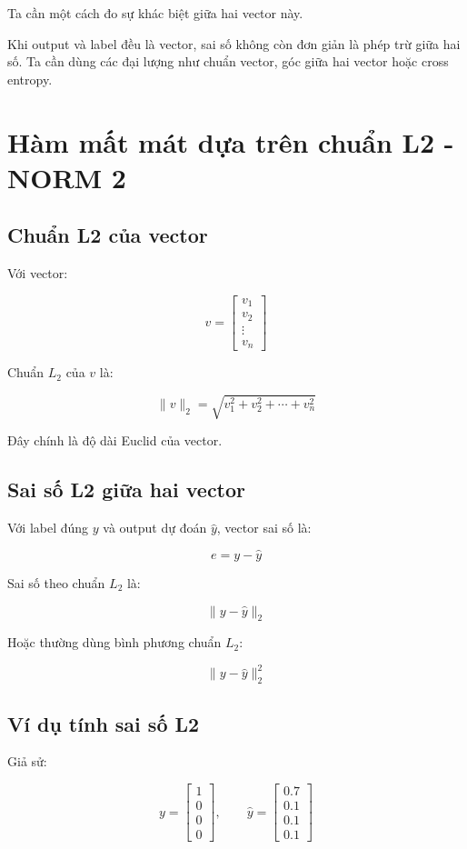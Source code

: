 \documentclass[12pt,a4paper]{report}
\begin{document}
Ta cần một cách đo sự khác biệt giữa hai vector này.

\begin{ghinho}
Khi output và label đều là vector, sai số không còn đơn giản là phép trừ giữa hai số. Ta cần dùng các đại lượng như chuẩn vector, góc giữa hai vector hoặc cross entropy.
\end{ghinho}

\chapter{Hàm mất mát dựa trên chuẩn L2 - NORM 2}

\section{Chuẩn L2 của vector}

Với vector:

\[
    v =
    \begin{bmatrix}
    v_1\\
    v_2\\
    \vdots\\
    v_n
    \end{bmatrix}
\]

Chuẩn $L_2$ của $v$ là:

\[
    \|v\|_2 = \sqrt{v_1^2+v_2^2+\cdots+v_n^2}
\]

Đây chính là độ dài Euclid của vector.

\section{Sai số L2 giữa hai vector}

Với label đúng $y$ và output dự đoán $\hat{y}$, vector sai số là:

\[
    e = y-\hat{y}
\]

Sai số theo chuẩn $L_2$ là:

\[
    \|y-\hat{y}\|_2
\]

Hoặc thường dùng bình phương chuẩn $L_2$:

\[
    \|y-\hat{y}\|_2^2
\]

\section{Ví dụ tính sai số L2}

Giả sử:

\[
    y =
    \begin{bmatrix}
    1\\0\\0\\0
    \end{bmatrix},
    \qquad
    \hat{y} =
    \begin{bmatrix}
    0.7\\0.1\\0.1\\0.1
    \end{bmatrix}
\]
\end{document}
